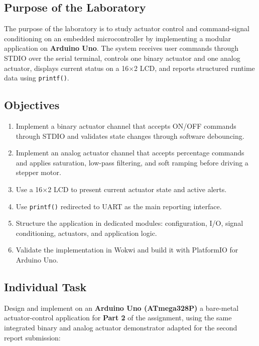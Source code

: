 \documentclass[12pt]{article}
\begin{document}
\subsection*{Purpose of the Laboratory}
\hspace{0.8cm} The purpose of the laboratory is to study actuator control and command-signal conditioning on an embedded microcontroller by implementing a modular application on \textbf{Arduino Uno}. The system receives user commands through STDIO over the serial terminal, controls one binary actuator and one analog actuator, displays current status on a 16$\times$2 LCD, and reports structured runtime data using \texttt{printf()}.

\subsection*{Objectives}
\begin{enumerate}
    \item Implement a binary actuator channel that accepts ON/OFF commands through STDIO and validates state changes through software debouncing.
    \item Implement an analog actuator channel that accepts percentage commands and applies saturation, low-pass filtering, and soft ramping before driving a stepper motor.
    \item Use a 16$\times$2 LCD to present current actuator state and active alerts.
    \item Use \texttt{printf()} redirected to UART as the main reporting interface.
    \item Structure the application in dedicated modules: configuration, I/O, signal conditioning, actuators, and application logic.
    \item Validate the implementation in Wokwi and build it with PlatformIO for Arduino Uno.
\end{enumerate}

\subsection*{Individual Task}
\hspace{0.8cm} Design and implement on an \textbf{Arduino Uno (ATmega328P)} a bare-metal actuator-control application for \textbf{Part 2} of the assignment, using the same integrated binary and analog actuator demonstrator adapted for the second report submission:
\end{document}

